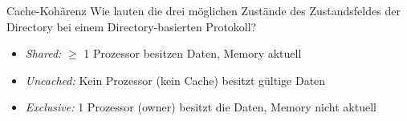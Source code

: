\begin{aufgabe}{Cache-Kohärenz}
    Wie lauten die drei möglichen Zustände des Zustandsfeldes der Directory bei einem Directory-basierten Protokoll?
    \tcblower
    \begin{itemize}
        \item \emph{Shared:}     $\geq$ 1 Prozessor besitzen Daten, Memory aktuell
        \item \emph{Uncached:}   Kein Prozessor (kein Cache) besitzt gültige Daten
        \item \emph{Exclusive:}  1 Prozessor (owner) besitzt die Daten, Memory nicht aktuell
    \end{itemize}
\end{aufgabe}